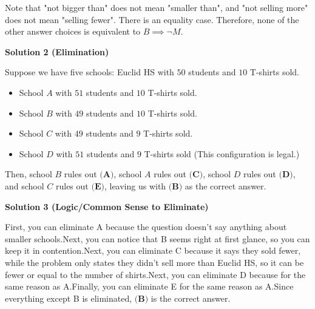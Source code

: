 \begin{enumerate}
 Note that "not bigger than" does not mean "smaller than", and "not selling more" does not mean "selling fewer". There is an equality case. Therefore, none of the other answer choices is equivalent to $B\implies\neg M.$




\textbf{Solution 2 (Elimination)}

Suppose we have five schools: Euclid HS with $50$ students and $10$ T-shirts sold.

 
            \begin{itemize}
        \item School $A$ with $51$ students and $10$ T-shirts sold.
            \end{itemize}
            
            \begin{itemize}
        \item School $B$ with $49$ students and $10$ T-shirts sold.
            \end{itemize}
            
            \begin{itemize}
        \item School $C$ with $49$ students and $9$ T-shirts sold.
            \end{itemize}
            
            \begin{itemize}
        \item School $D$ with $51$ students and $9$ T-shirts sold (This configuration is legal.)
            \end{itemize}
            Then, school $B$ rules out $\textbf{(A)}$, school $A$ rules out $\textbf{(C)}$, school $D$ rules out $\textbf{(D)}$, and school $C$ rules out $\textbf{(E)}$, leaving us with $\boxed{\textbf{(B)}}$ as the correct answer.

 



\textbf{Solution 3 (Logic/Common Sense to Eliminate)}

First, you can eliminate A because the question doesn't say anything about smaller schools.Next, you can notice that B seems right at first glance, so you can keep it in contention.Next, you can eliminate C because it says they sold fewer, while the problem only states they didn't sell more than Euclid HS, so it can be fewer or equal to the number of shirts.Next, you can eliminate D because for the same reason as A.Finally, you can eliminate E for the same reason as A.Since everything except B is eliminated, $\boxed{\textbf{(B)}}$ is the correct answer.


\end{enumerate}
